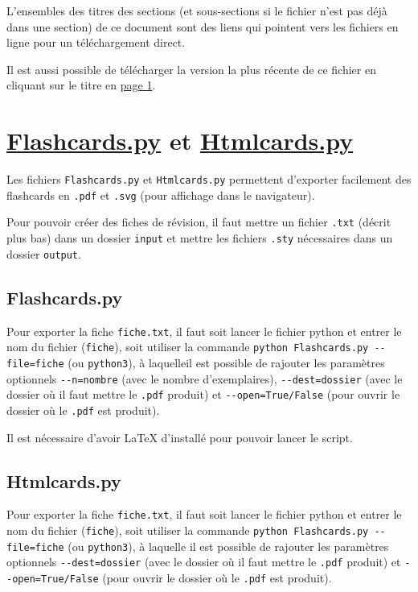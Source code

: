 \documentclass[a4paper,12pt]{article}
\let\oldsection\section
\newcommand{\ssection}[2][]{\clearpage\oldsection[#1]{#2}}
\newcounter{pagenb}
\begin{document}
\vspace{0.5cm}

L'ensembles des titres des sections (et sous-sections si le fichier n'est pas déjà dans une section) de ce document sont des liens qui pointent vers les fichiers en ligne pour un téléchargement direct.

Il est aussi possible de télécharger la version la plus récente de ce fichier en cliquant sur le titre en \hyperlink{section*.1}{page 1}.
\setcounter{pagenb}{\thepage}
\newpage
{}
\tableofcontents
\null\newpage
{}
\setcounter{page}{\thepagenb}
\ssection[Flashcards.py et Htmlcards.py]{\href{https://rfoxinter.github.io/revisions/Flashcards.py}{\color{black}Flashcards.py} et \href{https://rfoxinter.github.io/revisions/Htmlcards.py}{\color{black}Htmlcards.py}}
Les fichiers \texttt{Flashcards.py} et \texttt{Htmlcards.py} permettent d'exporter facilement des flashcards en \texttt{.pdf} et \texttt{.svg} (pour affichage dans le navigateur).

Pour pouvoir créer des fiches de révision, il faut mettre un fichier \texttt{.txt} (décrit plus bas) dans un dossier \texttt{input} et mettre les fichiers \texttt{.sty} nécessaires dans un dossier \texttt{output}.
\subsection{Flashcards.py}
Pour exporter la fiche \texttt{fiche.txt}, il faut soit lancer le fichier python et entrer le nom du fichier (\texttt{fiche}), soit utiliser la commande \texttt{python Flashcards.py -{}-file=fiche} (ou \texttt{python3}), à laquelleil est possible de rajouter les paramètres optionnels \texttt{-{}-n=nombre} (avec le nombre d'exemplaires), \texttt{-{}-dest=dossier} (avec le dossier où il faut mettre le \texttt{.pdf} produit) et \texttt{-{}-open=True/False} (pour ouvrir le dossier où le \texttt{.pdf} est produit).

Il est nécessaire d'avoir \LaTeX{} d'installé pour pouvoir lancer le script.
\subsection{Htmlcards.py}
Pour exporter la fiche \texttt{fiche.txt}, il faut soit lancer le fichier python et entrer le nom du fichier (\texttt{fiche}), soit utiliser la commande \texttt{python Flashcards.py -{}-file=fiche} (ou \texttt{python3}), à laquelle il est possible de rajouter les paramètres optionnels \texttt{-{}-dest=dossier} (avec le dossier où il faut mettre le \texttt{.pdf} produit) et \texttt{-{}-open=True/False} (pour ouvrir le dossier où le \texttt{.pdf} est produit).
\end{document}
